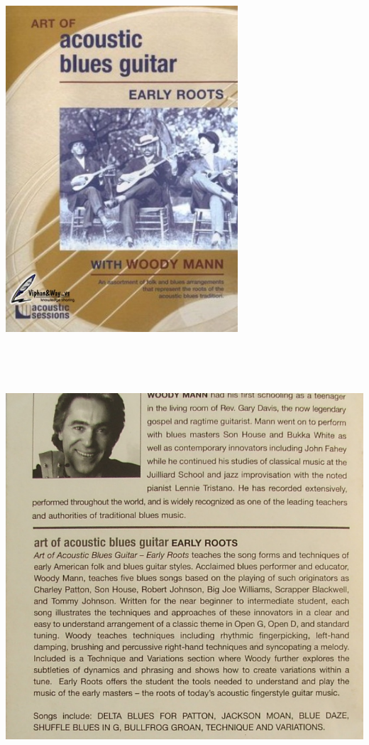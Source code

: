 \documentclass[a4paper]{book}
\begin{document}
\begin{center}
\includegraphics[width=8.64cm,height=12.144cm]{lebluessupportsmethodes-img47.jpg}
\end{center}





\clearpage

\begin{center}
\includegraphics[width=17cm,height=16.434cm]{lebluessupportsmethodes-img48.png}
\end{center}
\end{document}
